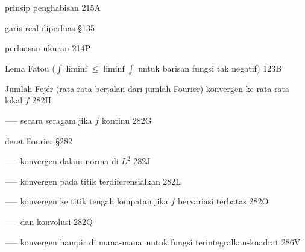 \indexmedskip































 prinsip penghabisan 215A

 garis real diperluas \S135

 perluasan ukuran 214P













\indexmedskip

 Lema Fatou ($\int\liminf\le\liminf\int$ untuk barisan fungsi tak negatif) 123B




 Jumlah Fej\'er (rata-rata berjalan dari jumlah Fourier) konvergen ke rata-rata lokal $f$ 282H


----- secara seragam jika $f$ kontinu 282G






















 deret Fourier \S282

----- konvergen dalam norma di $L^2$ 282J

----- konvergen pada titik terdiferensialkan 282L

----- konvergen ke titik tengah lompatan jika $f$ bervariasi terbatas 282O


----- dan konvolusi 282Q

----- konvergen hampir di mana-mana\ untuk fungsi terintegralkan-kuadrat 286V

